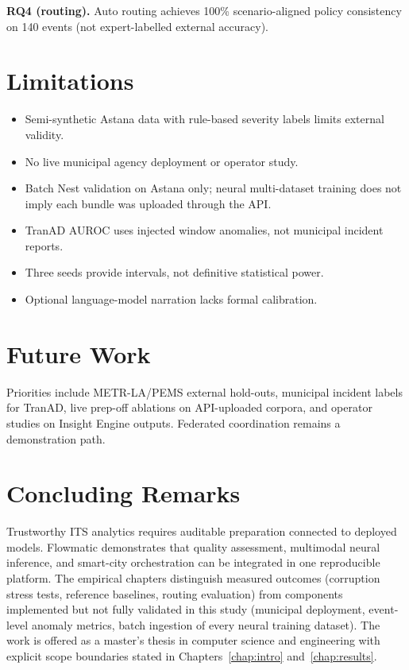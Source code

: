 \textbf{RQ4 (routing).} Auto routing achieves 100\% scenario-aligned policy consistency on 140 events (not expert-labelled external accuracy).

\section{Limitations}

\begin{itemize}
  \item Semi-synthetic Astana data with rule-based severity labels limits external validity.
  \item No live municipal agency deployment or operator study.
  \item Batch Nest validation on Astana only; neural multi-dataset training does not imply each bundle was uploaded through the API.
  \item TranAD AUROC uses injected window anomalies, not municipal incident reports.
  \item Three seeds provide intervals, not definitive statistical power.
  \item Optional language-model narration lacks formal calibration.
\end{itemize}

\section{Future Work}

Priorities include METR-LA/PEMS external hold-outs, municipal incident labels for TranAD, live prep-off ablations on API-uploaded corpora, and operator studies on Insight Engine outputs. Federated coordination remains a demonstration path.

\section{Concluding Remarks}

Trustworthy ITS analytics requires auditable preparation connected to deployed models. Flowmatic demonstrates that quality assessment, multimodal neural inference, and smart-city orchestration can be integrated in one reproducible platform. The empirical chapters distinguish measured outcomes (corruption stress tests, reference baselines, routing evaluation) from components implemented but not fully validated in this study (municipal deployment, event-level anomaly metrics, batch ingestion of every neural training dataset). The work is offered as a master's thesis in computer science and engineering with explicit scope boundaries stated in Chapters~\ref{chap:intro} and~\ref{chap:results}.
